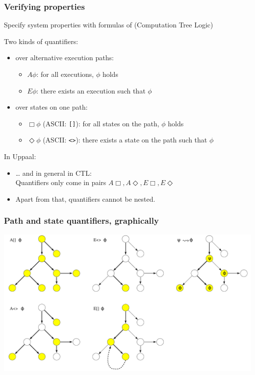 \documentclass{beamer}
\begin{document}
\begin{frame}[fragile]\frametitle{Verifying properties}

  Specify system properties with formulas of  (Computation Tree Logic)

  \vspace{3mm}

  Two kinds of quantifiers:
  \begin{itemize}
  \item {} over alternative execution paths:
    \begin{itemize}
    \item $A \phi$: for all executions, $\phi$ holds
    \item $E \phi$: there exists an execution such that $\phi$
    \end{itemize}
  \item {} over states on one path:
    \begin{itemize}
    \item $\Box \phi$ (ASCII: \texttt{[]}): for all states on the path, $\phi$ holds
    \item $\Diamond \phi$ (ASCII: \texttt{<>}): there exists a state on the path such that $\phi$
    \end{itemize}
  \end{itemize}
  
  \vspace{3mm}
  In Uppaal:
  \begin{itemize}
  \item \dots{} and in general in CTL:\\
    Quantifiers only come in pairs $A \Box, A \Diamond, E \Box, E \Diamond$
  \item Apart from that, quantifiers cannot be nested.
  \end{itemize}
  
\end{frame}


\begin{frame}[fragile]\frametitle{Path and state quantifiers, graphically}

  \begin{center}
    \includegraphics[scale=0.4]{Figures/path_and_state_quantifiers.png}
  \end{center}

\end{frame}
\end{document}
